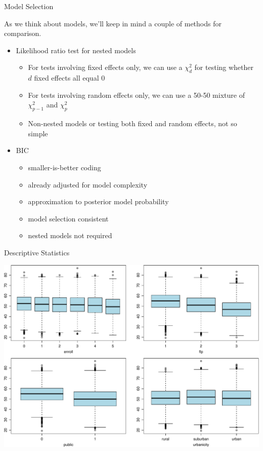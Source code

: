 \documentclass[ignorenonframetext,]{beamer}
\providecommand{\tightlist}{%
  \setlength{\itemsep}{0pt}\setlength{\parskip}{0pt}}
\begin{document}
\begin{frame}{Model Selection}

As we think about models, we'll keep in mind a couple of methods for
comparison.

\begin{itemize}
\tightlist
\item
  Likelihood ratio test for nested models

  \begin{itemize}
  \tightlist
  \item
    For tests involving fixed effects only, we can use a \(\chi^2_d\)
    for testing whether \(d\) fixed effects all equal 0
  \item
    For tests involving random effects only, we can use a 50-50 mixture
    of \(\chi^2_{p-1}\) and \(\chi^2_p\)
  \item
    Non-nested models or testing both fixed and random effects, not so
    simple
  \end{itemize}
\item
  BIC

  \begin{itemize}
  \tightlist
  \item
    smaller-is-better coding
  \item
    already adjusted for model complexity
  \item
    approximation to posterior model probability
  \item
    model selection consistent
  \item
    nested models not required
  \end{itemize}
\end{itemize}

\end{frame}

\begin{frame}{Descriptive Statistics}

\includegraphics{ancova_01_deck_files/figure-beamer/boxplots-1.pdf}

\end{frame}
\end{document}
